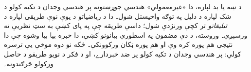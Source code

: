 \documentclass[../../../include/open-logic-section]{subfiles}
\begin{document}
د ښه يا بد لپاره، دا «غيرمعمولي» هندسي جوړښتونه پر هندسي وجدان د تکيه کولو د شک لپاره د دليل په توګه واخيستل شول۔ دا د رياضياتو د يوې نوې طريقې لپاره د \emph{تبليغاتو} تر کچې ورنژدې شول؛ داسې طريقه چې په پای کښې به سټ نظريې ته ورسېږي۔ وروسته، د دې مضمون په اسطوري بيانونو کښې، دا خبره بيا بيا وشوه چې دا نتيجې هم پوره کره وې او هم پوره ټکان ورکوونکې۔ ځکه نو دوه موخې يې ترسره کولې: پر هندسي وجدان د تکيه کولو پر ضد خبردارے، او د فکر د نويو طريقو د حاصل ورکولو څرګندونه۔
\end{document}
